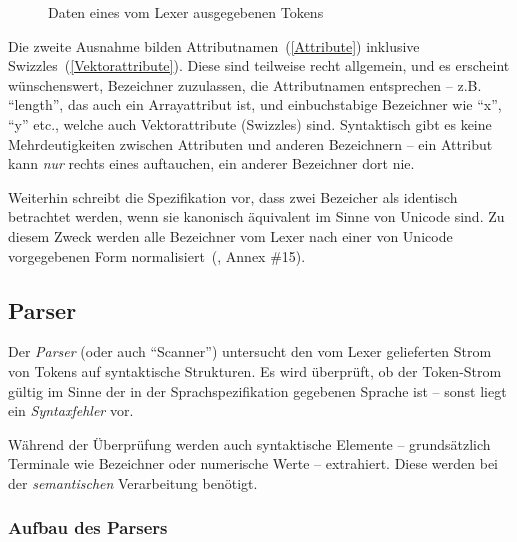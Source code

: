 \documentclass[twoside,a4paper,fleqn,12pt]{article}
\begin{document}
\begin{figure}[h]
   \centering
  
  \caption{Daten eines vom Lexer ausgegebenen Tokens}
  \label{fig:LexerToken}
\end{figure}

Die zweite Ausnahme bilden Attributnamen~(\ref{Attribute}) inklusive Swizzles~(\ref{Vektorattribute}). Diese sind teilweise recht allgemein, und
es erscheint wünschenswert, Bezeichner zuzulassen, die Attributnamen entsprechen -- z.B. ``length'', das auch ein Arrayattribut ist, und einbuchstabige
Bezeichner wie ``x'', ``y'' etc., welche auch Vektorattribute (Swizzles) sind. Syntaktisch gibt es keine Mehrdeutigkeiten zwischen Attributen und
anderen Bezeichnern -- ein Attribut kann \emph{nur} rechts eines  auftauchen, ein anderer Bezeichner dort nie.

Weiterhin schreibt die Spezifikation vor, dass zwei Bezeicher als identisch betrachtet werden, wenn sie kanonisch äquivalent im Sinne von Unicode sind.
Zu diesem Zweck werden alle Bezeichner vom Lexer nach einer von Unicode vorgegebenen Form normalisiert~(\cite{unicode}, Annex \#15).

\subsection{Parser}

Der \emph{Parser} (oder auch "`Scanner"') untersucht den vom Lexer gelieferten Strom von Tokens auf syntaktische Strukturen.
Es wird überprüft, ob der Token-Strom gültig im Sinne der in der Sprachspezifikation gegebenen Sprache ist --
sonst liegt ein \emph{Syntaxfehler} vor.

Während der Überprüfung werden auch syntaktische Elemente -- grundsätzlich Terminale wie Bezeichner oder numerische Werte -- extrahiert.
Diese werden bei der \emph{semantischen} Verarbeitung benötigt.




\subsubsection{Aufbau des Parsers}
\end{document}
